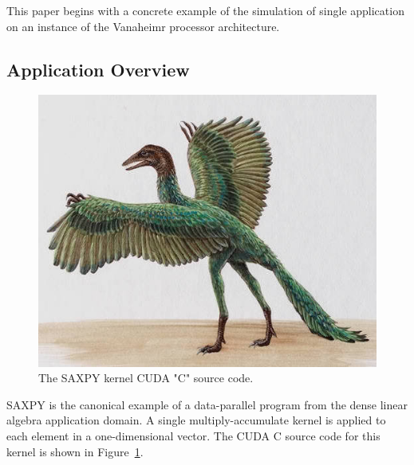 \documentclass[conference, 10pt]{IEEEtran}
\begin{document}
This paper begins with a concrete example of the simulation of single
application on an instance of the Vanaheimr processor architecture.  

\subsection{Application Overview}

\begin{figure}
	\begin{center}
		\includegraphics[width=0.9\linewidth]{archaeopteryx-bird}
		\caption{The SAXPY kernel CUDA "C" source code.}
		\label{fig:saxpy-kernel-source}
	\end{center}
\end{figure}

SAXPY is the canonical example of a data-parallel program from the dense linear
algebra application domain.  A single multiply-accumulate kernel is applied to
each element in a one-dimensional vector.  The CUDA C source code for this
kernel is shown in Figure~\ref{fig:saxpy-kernel-source}.
\end{document}

